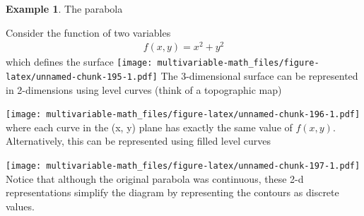 \documentclass[
]{book}
\newenvironment{Shaded}{\begin{snugshade}}{\end{snugshade}}
\newcommand{\DataTypeTok}[1]{\textcolor[rgb]{0.13,0.29,0.53}{#1}}
\newcommand{\DecValTok}[1]{\textcolor[rgb]{0.00,0.00,0.81}{#1}}
\newcommand{\KeywordTok}[1]{\textcolor[rgb]{0.13,0.29,0.53}{\textbf{#1}}}
\newcommand{\NormalTok}[1]{#1}
\newcommand{\OperatorTok}[1]{\textcolor[rgb]{0.81,0.36,0.00}{\textbf{#1}}}
\newcommand{\StringTok}[1]{\textcolor[rgb]{0.31,0.60,0.02}{#1}}
\theoremstyle{definition}
\theoremstyle{definition}
\newtheorem{example}{Example}[chapter]
\theoremstyle{definition}
\theoremstyle{definition}
\theoremstyle{remark}
\begin{document}
\begin{example}
The parabola

Consider the function of two variables
\[
\begin{aligned}
f(x, y) = x^2 + y^2
\end{aligned}
\]
which defines the surface
\texttt{[image: multivariable-math\_files/figure-latex/unnamed-chunk-195-1.pdf]}
The 3-dimensional surface can be represented in 2-dimensions using level curves (think of a topographic map)

\begin{Shaded}
\end{Shaded}

\texttt{[image: multivariable-math\_files/figure-latex/unnamed-chunk-196-1.pdf]}
where each curve in the (x, y) plane has exactly the same value of \(f(x, y)\). Alternatively, this can be represented using filled level curves

\begin{Shaded}
\end{Shaded}

\texttt{[image: multivariable-math\_files/figure-latex/unnamed-chunk-197-1.pdf]}
Notice that although the original parabola was continuous, these 2-d representations simplify the diagram by representing the contours as discrete values.
\end{example}
\end{document}
